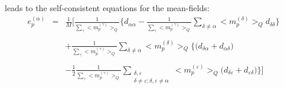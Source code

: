 \documentclass[a4paper,11pt]{article}
\begin{document}
leads to the self-consistent equations for the mean-fields:
\begin{equation}
	\begin{array}{lll}
		e_p^{(\alpha)}
		& = & \frac{1}{M} \Bigg[ \frac{1}{\sum\limits_\gamma 
			\big< m_p^{(\gamma)} \big>_Q}
			\Bigg\{ d_{\alpha\alpha} - 
				\frac{1}{\sum\limits_\gamma 
				\big< m_p^{(\gamma)} 
			\big>_Q}
			\sum\limits_{\delta \neq \alpha} \big< m_p^{(\delta)}
				\big>_Q d_{\delta\delta} \Bigg\} \\\\
		&& + \frac{1}{\sum\limits_\gamma \big< m_p^{(\gamma)} 
			\big>_Q} \sum\limits_{\delta \neq \alpha} 
				\big< m_p^{(\delta)} \big>_Q
			\Bigg\{ \big( d_{\delta\alpha} + d_{\alpha\delta} 
			\big) \\\\
		&& -\frac{1}{2} \frac{1}{\sum\limits_\gamma 
			\big< m_p^{(\gamma)} \big>_Q}
			\sum\limits_{\substack{\delta, \varepsilon \\
				\delta \neq \varepsilon; \delta, \varepsilon
					\neq \alpha}} 
				\big< m_p^{(\varepsilon)} \big>_Q
				\big( d_{\delta\varepsilon} 
				+ d_{\varepsilon\delta} \big)
			\Bigg\}
		\Bigg]
	\end{array}
\end{equation}
\end{document}
